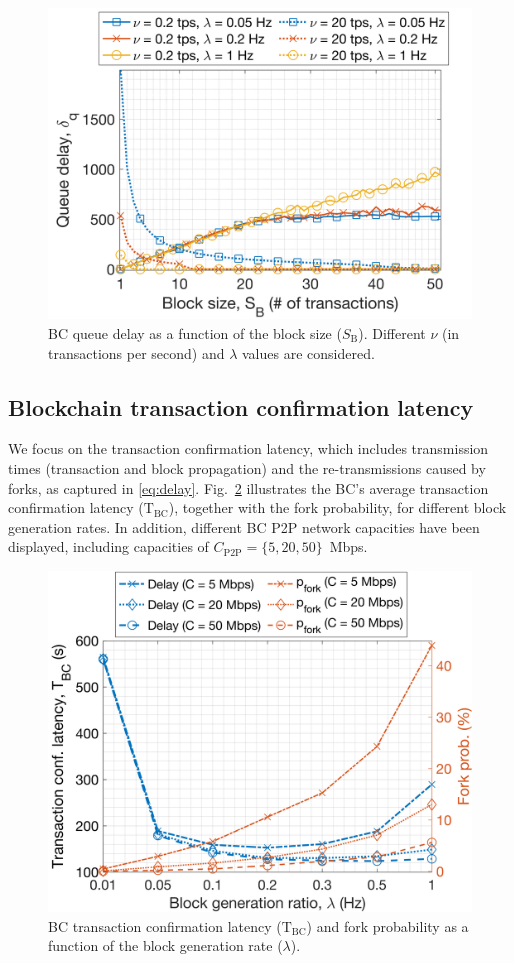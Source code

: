 \documentclass[10pt,journal,compsoc]{IEEEtran}
\begin{document}
\begin{figure}[ht!]
	\centering
	\includegraphics[width=.75\linewidth]{img/0_block_size_delay.png}
	\caption{BC queue delay as a function of the block size ($S_\text{B}$). Different $\nu$ (in transactions per second) and $\lambda$ values are considered.}
	\label{fig:2_block_size_lambda02}
\end{figure}

\subsection{Blockchain transaction confirmation latency}

We focus on the transaction confirmation latency, which includes transmission times (transaction and block propagation) and the re-transmissions caused by forks, as captured in \eqref{eq:delay}. Fig.~\ref{fig:4_transaction_confirmation_delay} illustrates the BC's average transaction confirmation latency ($\text{T}_\text{BC}$), together with the fork probability, for different block generation rates. In addition, different BC P2P network capacities have been displayed, including capacities of $C_\text{P2P}=\{5, 20, 50\}$~Mbps.

\begin{figure}[ht!]
	\centering
	\includegraphics[width=.75\linewidth]{img/2_transaction_confirmation_delay_3.png}
	\caption{BC transaction confirmation latency ($\text{T}_\text{BC}$) and fork probability as a function of the block generation rate ($\lambda$).}
	\label{fig:4_transaction_confirmation_delay}
\end{figure}
\end{document}
